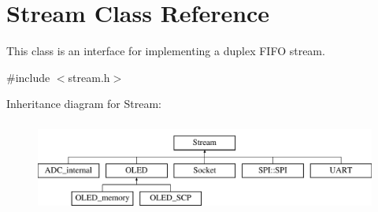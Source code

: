 \hypertarget{class_stream}{}\section{Stream Class Reference}
\label{class_stream}


This class is an interface for implementing a duplex F\+I\+FO stream.  




{\ttfamily \#include $<$stream.\+h$>$}

Inheritance diagram for Stream\+:\begin{figure}[H]
\begin{center}
\leavevmode
\includegraphics[height=3.000000cm]{class_stream}
\end{center}
\end{figure}
